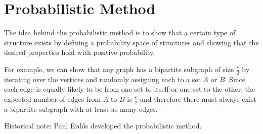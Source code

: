 \chapter{Probabilistic Method}

The idea behind the probabilistic method is to show that a certain
type of structure exists by defining a probability space of structures
and showing that the desired properties hold with positive
probability.

For example, we can show that any graph has a bipartite subgraph of
size $\frac{e}{2}$ by iterating over the vertices and randomly
assigning each to a set $A$ or $B$.  Since each edge is equally likely
to be from one set to itself or one set to the other, the expected
number of edges from $A$ to $B$ is $\frac{e}{2}$ and therefore there
must always exist a bipartite subgraph with at least as many edges.

Historical note: Paul Erd\H{o}s developed the probabilistic method.
